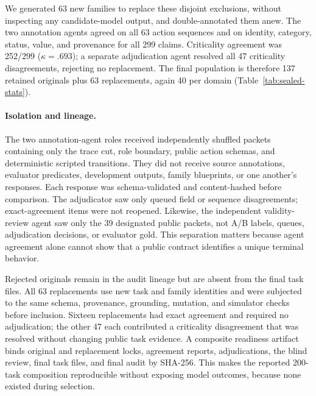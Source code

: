 We generated 63 new families to replace these disjoint exclusions, without
inspecting any candidate-model output, and double-annotated them anew. The two
annotation agents agreed on all 63 action sequences and on identity, category,
status,
value, and provenance for all 299 claims. Criticality agreement was 252/299
($\kappa=.693$); a separate adjudication agent resolved all 47 criticality
disagreements,
rejecting no replacement. The final population is therefore 137 retained
originals plus 63 replacements, again 40 per domain (Table~\ref{tab:sealed-stats}).

\paragraph{Isolation and lineage.}
The two annotation-agent roles received independently shuffled packets containing only the
trace cut, role boundary, public action schemas, and deterministic scripted
transitions. They did not receive source annotations, evaluator predicates,
development outputs, family blueprints, or one another's responses. Each
response was schema-validated and content-hashed before comparison. The
adjudicator saw only queued field or sequence disagreements; exact-agreement
items were not reopened. Likewise, the independent validity-review agent saw only
the 39 designated public packets, not A/B labels, queues, adjudication decisions,
or evaluator gold. This separation matters because agent agreement alone
cannot show that a public contract identifies a unique terminal behavior.

Rejected originals remain in the audit lineage but are absent from the final
task files. All 63 replacements use new task and family identities and were
subjected to the same schema, provenance, grounding, mutation, and simulator
checks before inclusion. Sixteen replacements had exact agreement and required
no adjudication; the other 47 each contributed a criticality disagreement that
was resolved without changing public task evidence. A composite readiness
artifact binds original and replacement locks, agreement reports, adjudications,
the blind review, final task files, and final audit by SHA-256. This makes the
reported 200-task composition reproducible without exposing model outcomes,
because none existed during selection.

